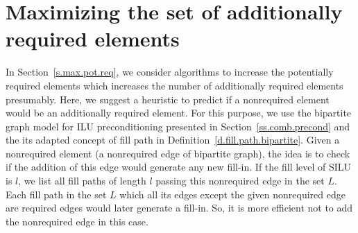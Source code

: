\documentclass[12pt, twoside,a4paper,toc=bibliography]{scrbook}
\newcommand{\secref}[1]{Section~\protect\ref{#1}}
\newcommand{\defref}[1]{Definition~\protect\ref{#1}}
\begin{document}
\clearpage
\section{Maximizing the set of additionally required elements}
\label{s.max.add.req}
In \secref{s.max.pot.req}, we consider algorithms to increase the potentially required elements
which increases the number of additionally required elements presumably.
Here, we suggest a heuristic to predict if a nonrequired element would be an
additionally required element. 
For this purpose, we use the bipartite graph model for ILU preconditioning
presented in \secref{ss.comb.precond} and the its adapted concept of fill path in 
\defref{d.fill.path.bipartite}. Given a nonrequired element
(a nonrequired edge of bipartite graph),
the idea is to check if the addition of this edge would generate any new fill-in.
If the fill level of SILU is $l$, we list all fill paths of length $l$ passing this nonrequired edge
in the set $L$. Each fill path in the set $L$ which all its edges except the given nonrequired edge
are required edges would later generate a fill-in. So, it is more efficient not to add the
nonrequired edge in this case.
\end{document}
